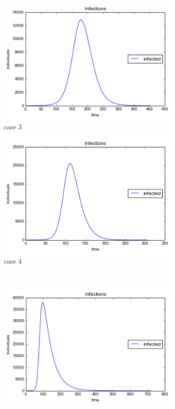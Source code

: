\begin{figure}[h]
\begin{subfigure}[b]{0.3\textwidth}
        \includegraphics[width=\textwidth]{images/2infections.png} 
        \caption{case 3}
        \label{c}
    \end{subfigure}
       \begin{subfigure}[b]{0.3\textwidth}
        \includegraphics[width=\textwidth]{images/4infections}
        \caption{case 4}
        \label{d}
    \end{subfigure}
    ~ %
    \begin{subfigure}[b]{0.3\textwidth}
        \includegraphics[width=\textwidth]{images/5infections.png} 

\end{subfigure}
\end{figure}
